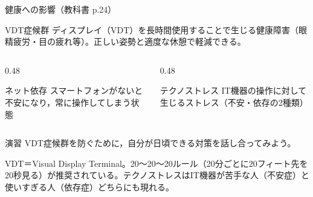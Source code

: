\documentclass[aspectratio=43,professionalfonts,handout,10pt]{beamer}
\begin{document}

\begin{frame}{健康への影響（教科書 p.24）}
  \begin{block}{VDT症候群}
    \small
    ディスプレイ（VDT）を長時間使用することで生じる健康障害（眼精疲労・目の疲れ等）。正しい姿勢と適度な休憩で軽減できる。
  \end{block}

  \begin{columns}[T]
    \begin{column}{0.48\textwidth}
      \begin{exampleblock}{ネット依存}
        \small
        スマートフォンがないと不安になり，常に操作してしまう状態
      \end{exampleblock}
    \end{column}
    \begin{column}{0.48\textwidth}
      \begin{exampleblock}{テクノストレス}
        \small
        IT機器の操作に対して生じるストレス（不安・依存の2種類）
      \end{exampleblock}
    \end{column}
  \end{columns}

  \begin{exampleblock}{演習}
    VDT症候群を防ぐために，自分が日頃できる対策を話し合ってみよう。
  \end{exampleblock}

  \begin{slidenote}
    VDT＝Visual Display Terminal。20〜20〜20ルール（20分ごとに20フィート先を20秒見る）が推奨されている。テクノストレスはIT機器が苦手な人（不安症）と使いすぎる人（依存症）どちらにも現れる。
  \end{slidenote}
\end{frame}

\end{document}

